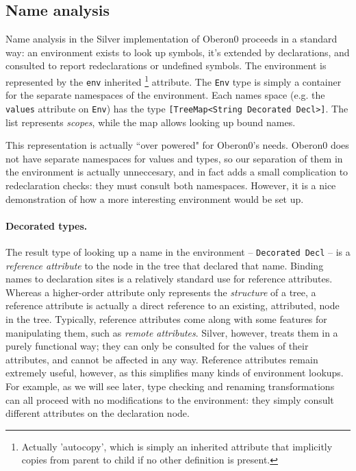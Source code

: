 \subsection{Name analysis}

Name analysis in the Silver implementation of Oberon0 proceeds in a standard
way: an environment exists to look up symbols, it's extended by declarations,
and consulted to report redeclarations or undefined symbols.
%
The environment is represented by the \texttt{env} inherited
 \footnote{Actually 'autocopy', which is simply an inherited attribute
 that implicitly copies from parent to child if no other definition is present.}
attribute.
%
%
The \texttt{Env} type is simply a container for the separate namespaces of the
environment.
%
Each names space (e.g. the \texttt{values} attribute on \texttt{Env}) has the
type \texttt{[TreeMap<String  Decorated Decl>]}.
%
The list represents \textit{scopes}, while the map allows looking up bound
names.

This representation is actually ``over powered" for Oberon0's needs.
%
Oberon0 does not have separate namespaces for values and types, so our
separation of them in the environment is actually unneccesary, and in fact
adds a small complication to redeclaration checks: they must consult both
namespaces.
%
However, it is a nice demonstration of how a more interesting environment
would be set up.

%

\paragraph{Decorated types.}
The result type of looking up a name in the environment -- \texttt{Decorated Decl} --
is a \textit{reference attribute} to the node in the tree that declared that name.
%
Binding names to declaration sites is a relatively standard use for
reference attributes.
%
%
Whereas a higher-order attribute only represents the \textit{structure} of
a tree, a reference attribute is actually a direct reference to an existing,
attributed, node in the tree.
%
Typically, reference attributes come along with some features for manipulating
them, such as \textit{remote attributes}.
%
Silver, however, treats them in a purely functional way; they can only be
consulted for the values of their attributes, and cannot be affected in
any way.
%
Reference attributes remain extremely useful, however, as this simplifies
many kinds of environment lookups.
%
For example, as we will see later, type checking and renaming transformations
can all proceed with no modifications to the environment: they simply consult
different attributes on the declaration node.


